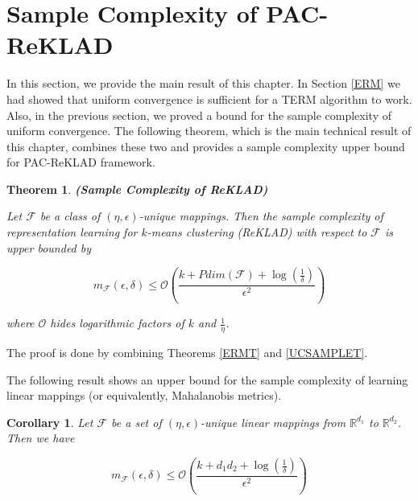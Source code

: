 \documentclass[letterpaper,12pt,titlepage,oneside,final]{book}
\newtheorem{remark}{Remark}
\newtheorem{theorem}{Theorem}
\newtheorem{corollary}{Corollary}
\begin{document}
\section{Sample Complexity of PAC-ReKLAD}

In this section, we provide the main result of this chapter. In Section \ref{ERM} we had showed that uniform convergence is sufficient for a TERM algorithm to work. Also, in the previous section, we proved a bound for the sample complexity of uniform convergence. The following theorem, which is the main technical result of this chapter, combines these two and provides a sample complexity upper bound for PAC-ReKLAD framework.


\begin{theorem}{\bf(Sample Complexity of ReKLAD)}

Let $\mathcal{F}$ be a class of $(\eta, \epsilon)$-unique mappings. Then the sample complexity of representation learning for $k$-means clustering (ReKLAD) with respect to $\mathcal{F}$ is upper bounded by

\begin{equation}
m_{\mathcal{F}}(\epsilon, \delta) \leq \mathcal{O}(\frac{ k + Pdim(\mathcal{F})+\log(\frac{1}{\delta})}{\epsilon^2})
\end{equation}

where $\mathcal{O}$ hides logarithmic factors of $k$ and $\frac{1}{\eta}$.

\end{theorem}

The proof is done by combining Theorems \ref{ERMT} and \ref{UCSAMPLET}. 


The following result shows an upper bound for the sample complexity of learning linear mappings (or equivalently, Mahalanobis metrics).

\begin{corollary} Let $\mathcal{F}$ be a set of $(\eta,\epsilon)$-unique \emph{linear} mappings from $\mathbb{R}^{d_1}$ to $\mathbb{R}^{d_2}$. Then we have

\begin{equation}
m_{\mathcal{F}}(\epsilon, \delta) \leq \mathcal{O}(\frac{ k + d_1d_2+\log(\frac{1}{\delta})}{\epsilon^2})
\end{equation}

\end{corollary}
\end{document}
